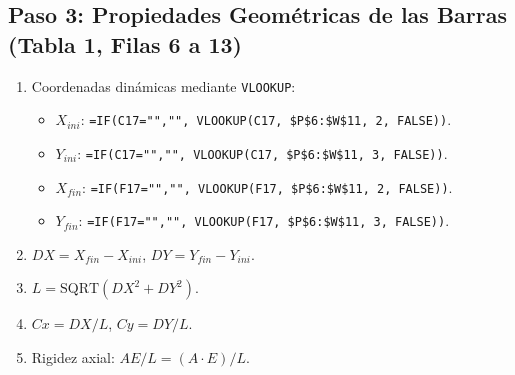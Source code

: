 \documentclass[11pt,a4paper]{article}
\begin{document}
\subsection{Paso 3: Propiedades Geométricas de las Barras (Tabla 1, Filas 6 a 13)}
\begin{enumerate}
    \item Coordenadas dinámicas mediante \texttt{VLOOKUP}:
    \begin{itemize}
        \item $X_{ini}$: \texttt{=IF(C17="","", VLOOKUP(C17, \$P\$6:\$W\$11, 2, FALSE))}.
        \item $Y_{ini}$: \texttt{=IF(C17="","", VLOOKUP(C17, \$P\$6:\$W\$11, 3, FALSE))}.
        \item $X_{fin}$: \texttt{=IF(F17="","", VLOOKUP(F17, \$P\$6:\$W\$11, 2, FALSE))}.
        \item $Y_{fin}$: \texttt{=IF(F17="","", VLOOKUP(F17, \$P\$6:\$W\$11, 3, FALSE))}.
    \end{itemize}
    \item $DX = X_{fin} - X_{ini}$, $DY = Y_{fin} - Y_{ini}$.
    \item $L = \text{SQRT}(DX^2 + DY^2)$.
    \item $Cx = DX / L$, $Cy = DY / L$.
    \item Rigidez axial: $AE/L = (A \cdot E) / L$.
\end{enumerate}
\end{document}
